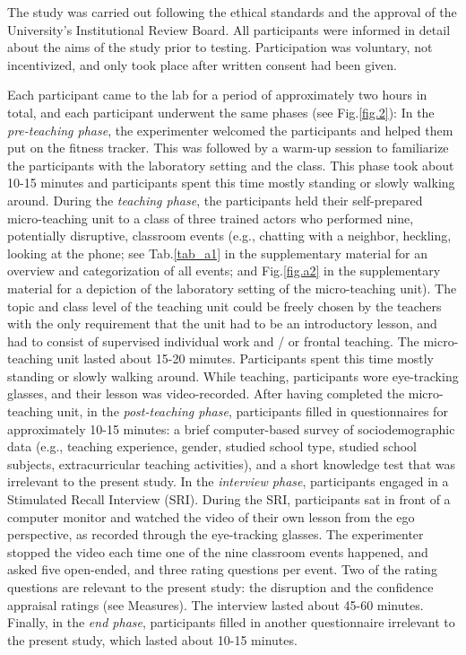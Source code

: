 \documentclass[preprint,
3p]{elsarticle} %
\begin{document}
The study was carried out following the ethical standards and the
approval of the University's Institutional Review Board. All
participants were informed in detail about the aims of the study prior
to testing. Participation was voluntary, not incentivized, and only took
place after written consent had been given.

Each participant came to the lab for a period of approximately two hours
in total, and each participant underwent the same phases (see
Fig.\ref{fig.2}): In the \emph{pre-teaching phase}, the experimenter
welcomed the participants and helped them put on the fitness tracker.
This was followed by a warm-up session to familiarize the participants
with the laboratory setting and the class. This phase took about 10-15
minutes and participants spent this time mostly standing or slowly
walking around. During the \emph{teaching phase}, the participants held
their self-prepared micro-teaching unit to a class of three trained
actors who performed nine, potentially disruptive, classroom events
(e.g., chatting with a neighbor, heckling, looking at the phone; see
Tab.\ref{tab_a1} in the supplementary material for an overview and
categorization of all events; and Fig.\ref{fig.a2} in the supplementary
material for a depiction of the laboratory setting of the micro-teaching
unit). The topic and class level of the teaching unit could be freely
chosen by the teachers with the only requirement that the unit had to be
an introductory lesson, and had to consist of supervised individual work
and / or frontal teaching. The micro-teaching unit lasted about 15-20
minutes. Participants spent this time mostly standing or slowly walking
around. While teaching, participants wore eye-tracking glasses, and
their lesson was video-recorded. After having completed the
micro-teaching unit, in the \emph{post-teaching phase}, participants
filled in questionnaires for approximately 10-15 minutes: a brief
computer-based survey of sociodemographic data (e.g., teaching
experience, gender, studied school type, studied school subjects,
extracurricular teaching activities), and a short knowledge test that
was irrelevant to the present study. In the \emph{interview phase},
participants engaged in a Stimulated Recall Interview (SRI). During the
SRI, participants sat in front of a computer monitor and watched the
video of their own lesson from the ego perspective, as recorded through
the eye-tracking glasses. The experimenter stopped the video each time
one of the nine classroom events happened, and asked five open-ended,
and three rating questions per event. Two of the rating questions are
relevant to the present study: the disruption and the confidence
appraisal ratings (see Measures). The interview lasted about 45-60
minutes. Finally, in the \emph{end phase}, participants filled in
another questionnaire irrelevant to the present study, which lasted
about 10-15 minutes. \newpage
\end{document}
